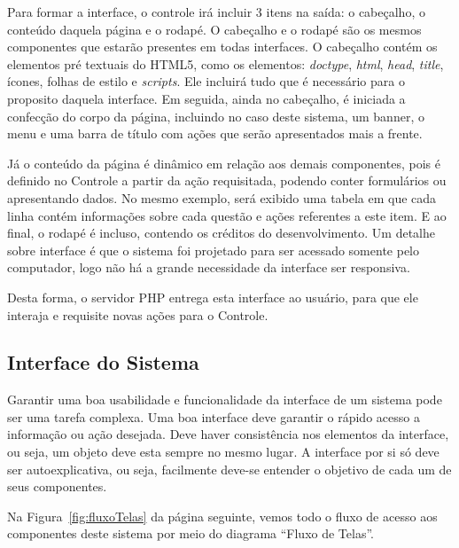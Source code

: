 \documentclass[
	12pt,				%
	openany,
	oneside,
	a4paper,			%
	english,			%
	brazil				%
	]{abntex2}
\begin{document}
  Para formar a interface, o controle irá incluir 3 itens na saída: o cabeçalho, o conteúdo daquela página e o rodapé. O cabeçalho e o rodapé são os mesmos componentes que estarão presentes em todas interfaces. O cabeçalho contém os elementos pré textuais do HTML5, como os elementos: \textit{doctype}, \textit{html}, \textit{head}, \textit{title}, ícones, folhas de estilo e \textit{scripts}. Ele incluirá tudo que é necessário para o proposito daquela interface. Em seguida, ainda no cabeçalho, é iniciada a confecção do corpo da página, incluindo no caso deste sistema, um banner, o menu e uma barra de título com ações que serão apresentados mais a frente.

  Já o conteúdo da página é dinâmico em relação aos demais componentes, pois é definido no Controle a partir da ação requisitada, podendo conter formulários ou apresentando dados. No mesmo exemplo, será exibido uma tabela em que cada linha contém informações sobre cada questão e ações referentes a este item. E ao final, o rodapé é incluso, contendo os créditos do desenvolvimento. Um detalhe sobre interface é que o sistema foi projetado para ser acessado somente pelo computador, logo não há a grande necessidade da interface ser responsiva.

  Desta forma, o servidor PHP entrega esta interface ao usuário, para que ele interaja e requisite novas ações para o Controle.



  \subsection{Interface do Sistema}

  Garantir uma boa usabilidade e funcionalidade da interface de um sistema pode ser uma tarefa complexa. Uma boa interface deve garantir o rápido acesso a informação ou ação desejada. Deve haver consistência nos elementos da interface, ou seja, um objeto deve esta sempre no mesmo lugar. A interface por si só deve ser autoexplicativa, ou seja, facilmente deve-se entender o objetivo de cada um de seus componentes.

  Na Figura~\ref{fig:fluxoTelas} da página seguinte, vemos todo o fluxo de acesso aos componentes deste sistema por meio do diagrama ``Fluxo de Telas''.
\end{document}
